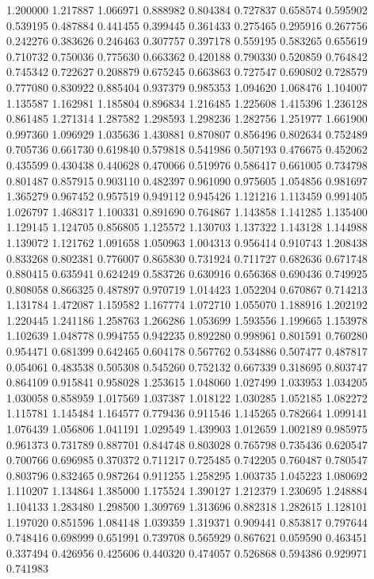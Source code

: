 1.200000
1.217887
1.066971
0.888982
0.804384
0.727837
0.658574
0.595902
0.539195
0.487884
0.441455
0.399445
0.361433
0.275465
0.295916
0.267756
0.242276
0.383626
0.246463
0.307757
0.397178
0.559195
0.583265
0.655619
0.710732
0.750036
0.775630
0.663362
0.420188
0.790330
0.520859
0.764842
0.745342
0.722627
0.208879
0.675245
0.663863
0.727547
0.690802
0.728579
0.777080
0.830922
0.885404
0.937379
0.985353
1.094620
1.068476
1.104007
1.135587
1.162981
1.185804
0.896834
1.216485
1.225608
1.415396
1.236128
0.861485
1.271314
1.287582
1.298593
1.298236
1.282756
1.251977
1.661900
0.997360
1.096929
1.035636
1.430881
0.870807
0.856496
0.802634
0.752489
0.705736
0.661730
0.619840
0.579818
0.541986
0.507193
0.476675
0.452062
0.435599
0.430438
0.440628
0.470066
0.519976
0.586417
0.661005
0.734798
0.801487
0.857915
0.903110
0.482397
0.961090
0.975605
1.054856
0.981697
1.365279
0.967452
0.957519
0.949112
0.945426
1.121216
1.113459
0.991405
1.026797
1.468317
1.100331
0.891690
0.764867
1.143858
1.141285
1.135400
1.129145
1.124705
0.856805
1.125572
1.130703
1.137322
1.143128
1.144988
1.139072
1.121762
1.091658
1.050963
1.004313
0.956414
0.910743
1.208438
0.833268
0.802381
0.776007
0.865830
0.731924
0.711727
0.682636
0.671748
0.880415
0.635941
0.624249
0.583726
0.630916
0.656368
0.690436
0.749925
0.808058
0.866325
0.487897
0.970719
1.014423
1.052204
0.670867
0.714213
1.131784
1.472087
1.159582
1.167774
1.072710
1.055070
1.188916
1.202192
1.220445
1.241186
1.258763
1.266286
1.053699
1.593556
1.199665
1.153978
1.102639
1.048778
0.994755
0.942235
0.892280
0.998961
0.801591
0.760280
0.954471
0.681399
0.642465
0.604178
0.567762
0.534886
0.507477
0.487817
0.054061
0.483538
0.505308
0.545260
0.752132
0.667339
0.318695
0.803747
0.864109
0.915841
0.958028
1.253615
1.048060
1.027499
1.033953
1.034205
1.030058
0.858959
1.017569
1.037387
1.018122
1.030285
1.052185
1.082272
1.115781
1.145484
1.164577
0.779436
0.911546
1.145265
0.782664
1.099141
1.076439
1.056806
1.041191
1.029549
1.439903
1.012659
1.002189
0.985975
0.961373
0.731789
0.887701
0.844748
0.803028
0.765798
0.735436
0.620547
0.700766
0.696985
0.370372
0.711217
0.725485
0.742205
0.760487
0.780547
0.803796
0.832465
0.987264
0.911255
1.258295
1.003735
1.045223
1.080692
1.110207
1.134864
1.385000
1.175524
1.390127
1.212379
1.230695
1.248884
1.104133
1.283480
1.298500
1.309769
1.313696
0.882318
1.282615
1.128101
1.197020
0.851596
1.084148
1.039359
1.319371
0.909441
0.853817
0.797644
0.748416
0.698999
0.651991
0.739708
0.565929
0.867621
0.059590
0.463451
0.337494
0.426956
0.425606
0.440320
0.474057
0.526868
0.594386
0.929971
0.741983
